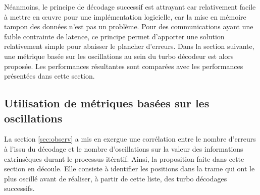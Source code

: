 Néanmoins, le principe de décodage successif est attrayant car relativement facile à mettre en œuvre pour une 
implémentation logicielle, car la mise en mémoire tampon des données n'est pas un problème.
Pour des communications ayant une faible contrainte de latence, ce principe permet d'apporter une solution relativement
simple pour abaisser le plancher d'erreurs. 
Dans la section suivante, une métrique basée sur les oscillations au sein du turbo décodeur est alors proposée. Les performances
résultantes sont comparées avec les performances présentées dans cette section.

\subsection{Utilisation de métriques basées sur les oscillations}
La section \ref{sec:observ} a mis en exergue une corrélation entre le nombre d'erreurs à l'issu du décodage et 
le nombre d'oscillations sur la valeur des informations extrinsèques durant le processus itératif. Ainsi, la proposition faite dans cette section en découle. Elle 
consiste à identifier les positions dans la trame qui ont le plus oscillé avant de réaliser, à partir de cette liste, des turbo décodages successifs.

